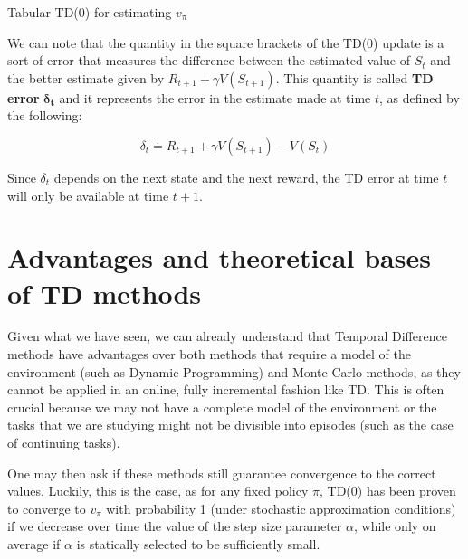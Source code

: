 \begin{algorithm}[H]
\SetAlgoLined
{}
\Parameters{step size $\alpha \in \left] 0,1 \right]$}

\caption{Tabular TD(0) for estimating $v_\pi$}
\end{algorithm}

We can note that the quantity in the square brackets of the TD(0) update is a sort of error that measures the difference between the estimated value of $S_t$ and the better estimate given by $R_{t+1} + \gamma V(S_{t+1})$. This quantity is called \textbf{TD error} $\boldsymbol{\delta_t}$ and it represents the error in the estimate made at time $t$, as defined by the following:

\begin{equation}
    \delta_t \doteq R_{t+1} + \gamma V(S_{t+1}) - V(S_t)
    \label{eq:ch5-tderrordeltat}
\end{equation}

Since $\delta_t$ depends on the next state and the next reward, the TD error at time $t$ will only be available at time $t+1$.

\section{Advantages and theoretical bases of TD methods}
Given what we have seen, we can already understand that Temporal Difference methods have advantages over both methods that require a model of the environment (such as Dynamic Programming) and Monte Carlo methods, as they cannot be applied in an online, fully incremental fashion like TD. This is often crucial because we may not have a complete model of the environment or the tasks that we are studying might not be divisible into episodes (such as the case of continuing tasks).

One may then ask if these methods still guarantee convergence to the correct values. Luckily, this is the case, as for any fixed policy $\pi$, TD(0) has been proven to converge to $v_\pi$ with probability 1 (under stochastic approximation conditions) if we decrease over time the value of the step size parameter $\alpha$, while only on average if $\alpha$ is statically selected to be sufficiently small.

